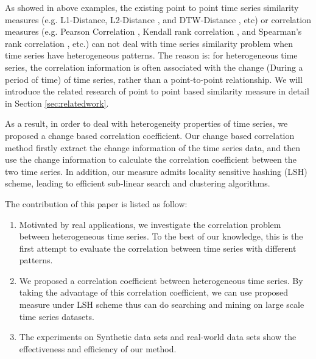 

As showed in above examples, the existing point to point time series similarity measures (e.g. L1-Distance, L2-Distance \cite{han2011data}, and DTW-Distance \cite{muller2007dynamic}, etc) or correlation measures (e.g. Pearson Correlation \cite{pearson1904mathematical}, Kendall rank correlation \cite{kendall1938new}, and Spearman's rank correlation \cite{pirie1988spearman}, etc.) can not deal with time series similarity problem when time series have heterogeneous patterns.
The reason is: for heterogeneous time series, the correlation information is often associated with the change (During a period of time) of time series, rather than a point-to-point relationship. We will introduce the related research of point to point based similarity measure in detail in Section \ref{sec:relatedwork}.

As a result, in order to deal with heterogeneity properties of time series, we proposed a change based correlation coefficient.
Our change based correlation method firstly extract the change information of the time series data, and then use the change information to calculate the correlation coefficient between the two time series.
In addition, our measure admits locality sensitive
hashing (LSH) scheme, leading to efficient sub-linear
search and clustering algorithms.

The contribution of this paper is listed as follow:
\begin{enumerate}
\item Motivated by real applications, we investigate the correlation
problem between heterogeneous time series.
To the best of our knowledge, this is the first attempt
to evaluate the correlation between time series with different patterns.

\item We proposed a correlation coefficient between heterogeneous time series. By taking the advantage of this correlation coefficient, we can use proposed measure under LSH scheme thus can do searching and mining on large scale time series datasets.

\item The experiments on Synthetic data sets and real-world data sets show the effectiveness and efficiency of our method.
\end{enumerate}

